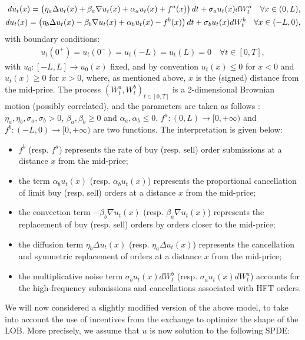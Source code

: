 \documentclass[11pt]{article}
\begin{document}
\begin{align}\label{SPDE0}
    du_t(x) = \left( \vphantom{\beta_b \nabla u_t(x) + \alpha_b u_t(x) -f^b(x)} \eta_a \Delta u_t(x) + \beta_a \nabla u_t(x) + \alpha_a u_t(x) +f^a(x) \right)dt + \sigma_a u_t(x) dW^a_t \quad \forall x \in (0,L),\\
    du_t(x) = \left( \eta_b \Delta u_t(x) - \beta_b \nabla u_t(x) + \alpha_b u_t(x) -f^b(x) \right)dt + \sigma_b u_t(x) dW^b_t \quad \forall x \in (-L,0),\nonumber
\end{align}
with boundary conditions:
\begin{align}\label{bound0}
    u_t(0^+) = u_t(0^-) = u_t(-L) = u_t(L) = 0 \quad \forall t \in [0,T],
\end{align}
with $u_0:[-L,L] \rightarrow u_0(x)$ fixed, and by convention $u_t(x) \le 0$ for $x<0$ and $u_t(x)\ge0$ for $x>0$, where, as mentioned above, $x$ is the (signed) distance from the mid-price. The process $(W^a_t, W^b_t)_{t \in [0,T]}$ is a 2-dimensional Brownian motion (possibly correlated), and the parameters are taken as follows : $\eta_a, \eta_b, \sigma_a, \sigma_b >0$, $\beta_a, \beta_b \ge 0$ and $\alpha_a, \alpha_b \le 0$. $f^a:(0,L) \rightarrow \mathbb [0,+\infty)$ and $f^b:(-L,0) \rightarrow [0,+\infty)$ are two functions. The interpretation is given below:
\begin{itemize}
    \item $f^b$ (resp. $f^a$) represents the rate of buy (resp. sell) order submissions at a distance $x$ from the mid-price;
    \item the term $\alpha_b u_t(x)$ (resp. $\alpha_b u_t(x)$) represents the proportional cancellation of limit buy (resp. sell) orders at a distance $x$ from the mid-price;
    \item the convection term $- \beta_b \nabla u_t(x)$ (resp. $\beta_a \nabla u_t(x)$) represents the replacement of buy (resp. sell) orders by orders closer to the mid-price;
    \item the diffusion term $\eta_b \Delta u_t(x)$ (resp. $\eta_a \Delta u_t(x)$) represents the cancellation and symmetric replacement of orders at a distance $x$ from the mid-price;
    \item the multiplicative noise term $\sigma_b u_t(x) dW^b_t$ (resp. $\sigma_a u_t(x) dW^a_t$) accounts for the high-frequency submissions and cancellations associated with HFT orders.
\end{itemize}

We will now considered a slightly modified version of the above model, to take into account the use of incentives from the exchange to optimize the shape of the LOB. More precisely, we assume that $u$ is now solution to the following SPDE:
\end{document}
